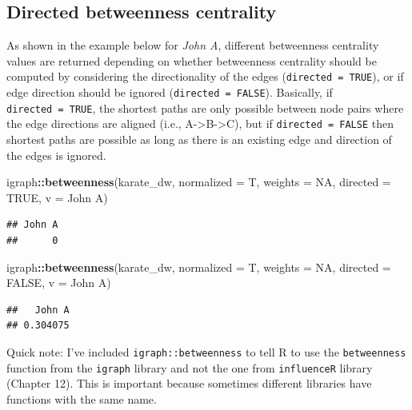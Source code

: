 \documentclass[
]{book}
\newenvironment{Shaded}{\begin{snugshade}}{\end{snugshade}}
\newcommand{\AttributeTok}[1]{\textcolor[rgb]{0.13,0.29,0.53}{#1}}
\newcommand{\ConstantTok}[1]{\textcolor[rgb]{0.56,0.35,0.01}{#1}}
\newcommand{\FunctionTok}[1]{\textcolor[rgb]{0.13,0.29,0.53}{\textbf{#1}}}
\newcommand{\NormalTok}[1]{#1}
\newcommand{\SpecialCharTok}[1]{\textcolor[rgb]{0.81,0.36,0.00}{\textbf{#1}}}
\newcommand{\StringTok}[1]{\textcolor[rgb]{0.31,0.60,0.02}{#1}}
\begin{document}
\subsection{Directed betweenness centrality}\label{directed-betweenness-centrality}

As shown in the example below for \emph{John A}, different betweenness centrality values are returned depending on whether betweenness centrality should be computed by considering the directionality of the edges (\texttt{directed\ =\ TRUE}), or if edge direction should be ignored (\texttt{directed\ =\ FALSE}). Basically, if \texttt{directed\ =\ TRUE}, the shortest paths are only possible between node pairs where the edge directions are aligned (i.e., A-\textgreater B-\textgreater C), but if \texttt{directed\ =\ FALSE} then shortest paths are possible as long as there is an existing edge and direction of the edges is ignored.

\begin{Shaded}
\begin{Highlighting}[]
\NormalTok{igraph}\SpecialCharTok{::}\FunctionTok{betweenness}\NormalTok{(karate\_dw, }\AttributeTok{normalized =}\NormalTok{ T, }\AttributeTok{weights =} \ConstantTok{NA}\NormalTok{, }\AttributeTok{directed =} \ConstantTok{TRUE}\NormalTok{, }\AttributeTok{v =} \StringTok{\textquotesingle{}John A\textquotesingle{}}\NormalTok{)}
\end{Highlighting}
\end{Shaded}

\begin{verbatim}
## John A 
##      0
\end{verbatim}

\begin{Shaded}
\begin{Highlighting}[]
\NormalTok{igraph}\SpecialCharTok{::}\FunctionTok{betweenness}\NormalTok{(karate\_dw, }\AttributeTok{normalized =}\NormalTok{ T, }\AttributeTok{weights =} \ConstantTok{NA}\NormalTok{, }\AttributeTok{directed =} \ConstantTok{FALSE}\NormalTok{, }\AttributeTok{v =} \StringTok{\textquotesingle{}John A\textquotesingle{}}\NormalTok{)}
\end{Highlighting}
\end{Shaded}

\begin{verbatim}
##   John A 
## 0.304075
\end{verbatim}

Quick note: I've included \texttt{igraph::betweenness} to tell R to use the \texttt{betweenness} function from the \texttt{igraph} library and not the one from \texttt{influenceR} library (Chapter 12). This is important because sometimes different libraries have functions with the same name.
\end{document}
